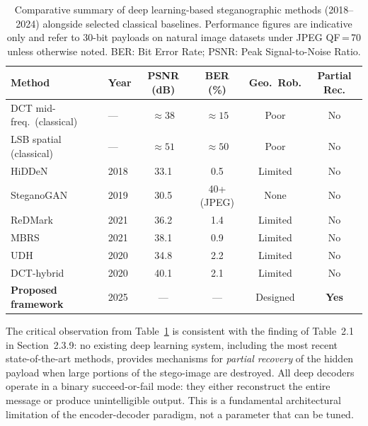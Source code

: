 \documentclass[12pt,a4paper,oneside]{report}
\begin{document}
	\begin{table}[htbp]
		\centering
		\caption{Comparative summary of deep learning-based steganographic methods (2018--2024)
			alongside selected classical baselines. Performance figures are indicative only
			and refer to $30$-bit payloads on natural image datasets under JPEG QF\,=\,70 unless
			otherwise noted. BER: Bit Error Rate; PSNR: Peak Signal-to-Noise Ratio.}
		\label{tab:dl_comparison}
		\small
		\renewcommand{\arraystretch}{1.3}
		\begin{tabular}{@{} l l c c c c @{}}
			\toprule
			\textbf{Method} & \textbf{Year} & \textbf{PSNR (dB)} & \textbf{BER (\%)} &
			\textbf{Geo.\ Rob.} & \textbf{Partial Rec.} \\
			\midrule
			DCT mid-freq.\ (classical) & ---  & $\approx\!38$ & $\approx\!15$ & Poor & No \\
			LSB spatial (classical)    & ---  & $\approx\!51$ & $\approx\!50$ & Poor & No \\
			\midrule
			HiDDeN \cite{zhu2018hidden}         & 2018 & 33.1 & 0.5  & Limited & No \\
			SteganoGAN \cite{zhang2019steganogan}& 2019 & 30.5 & 40+ (JPEG) & None & No \\
			ReDMark \cite{das2021redmark}        & 2021 & 36.2 & 1.4  & Limited & No \\
			MBRS \cite{jia2021mbrs}             & 2021 & 38.1 & 0.9  & Limited & No \\
			UDH \cite{zhang2020udh}             & 2020 & 34.8 & 2.2  & Limited & No \\
			DCT-hybrid \cite{ahmadi2020redmark} & 2020 & 40.1 & 2.1  & Limited & No \\
			\midrule
			\textbf{Proposed framework}         & 2025 & ---  & ---  & Designed & \textbf{Yes} \\
			\bottomrule
		\end{tabular}
	\end{table}
	
	The critical observation from Table~\ref{tab:dl_comparison} is consistent with the finding of
	Table~2.1 in Section~2.3.9: no existing deep learning system, including the most recent
	state-of-the-art methods, provides mechanisms for \emph{partial recovery} of the hidden payload
	when large portions of the stego-image are destroyed. All deep decoders operate in a binary
	succeed-or-fail mode: they either reconstruct the entire message or produce unintelligible output.
	This is a fundamental architectural limitation of the encoder-decoder paradigm, not a parameter
	that can be tuned.
	
\end{document}
